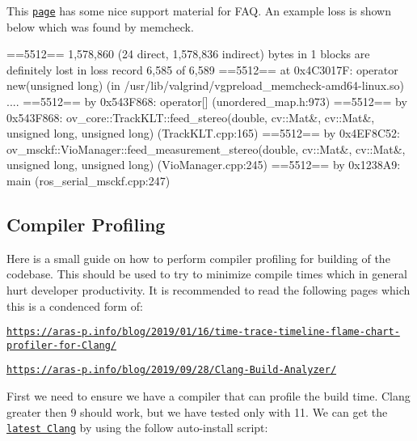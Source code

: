 This \href{https://web.stanford.edu/class/archive/cs/cs107/cs107.1206/resources/valgrind.html}{\tt page} has some nice support material for F\+AQ. An example loss is shown below which was found by memcheck.


\begin{DoxyCode}
==5512== 1,578,860 (24 direct, 1,578,836 indirect) bytes in 1 blocks are definitely lost in loss record
       6,585 of 6,589
==5512==    at 0x4C3017F: operator new(unsigned long) (in
       /usr/lib/valgrind/vgpreload\_memcheck-amd64-linux.so)
....
==5512==    by 0x543F868: operator[] (unordered\_map.h:973)
==5512==    by 0x543F868: ov\_core::TrackKLT::feed\_stereo(double, cv::Mat&, cv::Mat&, unsigned long,
       unsigned long) (TrackKLT.cpp:165)
==5512==    by 0x4EF8C52: ov\_msckf::VioManager::feed\_measurement\_stereo(double, cv::Mat&, cv::Mat&,
       unsigned long, unsigned long) (VioManager.cpp:245)
==5512==    by 0x1238A9: main (ros\_serial\_msckf.cpp:247)
\end{DoxyCode}
\hypertarget{dev-profiling_dev-profiling-compiler}{}\subsection{Compiler Profiling}\label{dev-profiling_dev-profiling-compiler}
Here is a small guide on how to perform compiler profiling for building of the codebase. This should be used to try to minimize compile times which in general hurt developer productivity. It is recommended to read the following pages which this is a condenced form of\+:


\begin{DoxyItemize}
\item \href{https://aras-p.info/blog/2019/01/16/time-trace-timeline-flame-chart-profiler-for-Clang/}{\tt https\+://aras-\/p.\+info/blog/2019/01/16/time-\/trace-\/timeline-\/flame-\/chart-\/profiler-\/for-\/\+Clang/}
\item \href{https://aras-p.info/blog/2019/09/28/Clang-Build-Analyzer/}{\tt https\+://aras-\/p.\+info/blog/2019/09/28/\+Clang-\/\+Build-\/\+Analyzer/}
\end{DoxyItemize}

First we need to ensure we have a compiler that can profile the build time. Clang greater then 9 should work, but we have tested only with 11. We can get the \href{https://apt.llvm.org/}{\tt latest Clang} by using the follow auto-\/install script\+:




